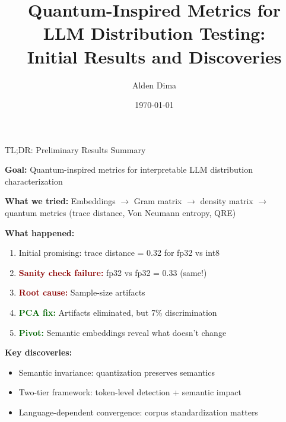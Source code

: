 \documentclass[aspectratio=169,11pt]{beamer}
\title{Quantum-Inspired Metrics for LLM Distribution Testing:\\
Initial Results and Discoveries}
\author{Alden Dima}
\date{\today}
\begin{document}
\begin{frame}
\titlepage
\end{frame}

\begin{frame}{TL;DR: Preliminary Results Summary}

\textbf{Goal:} Quantum-inspired metrics for interpretable LLM distribution characterization

\vspace{0.3em}

\textbf{What we tried:} Embeddings $\to$ Gram matrix $\to$ density matrix $\to$ quantum metrics (trace distance, Von Neumann entropy, QRE)

\vspace{0.3em}

\textbf{What happened:}
\begin{enumerate}
  \item Initial promising: trace distance = 0.32 for fp32 vs int8
  \item \textcolor{darkred}{\textbf{Sanity check failure:}} fp32 vs fp32 = 0.33 (same!)
  \item \textcolor{darkred}{\textbf{Root cause:}} Sample-size artifacts
  \item \textcolor{darkgreen}{\textbf{PCA fix:}} Artifacts eliminated, but 7\% discrimination
  \item \textcolor{darkgreen}{\textbf{Pivot:}} Semantic embeddings reveal what doesn't change
\end{enumerate}

\vspace{0.3em}

\textbf{Key discoveries:}
\begin{itemize}
  \item Semantic invariance: quantization preserves semantics
  \item Two-tier framework: token-level detection + semantic impact
  \item Language-dependent convergence: corpus standardization matters
\end{itemize}

\end{frame}
\end{document}

